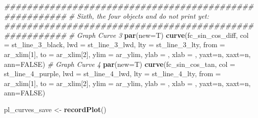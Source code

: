 \documentclass[
]{book}
\newenvironment{Shaded}{\begin{snugshade}}{\end{snugshade}}
\newcommand{\CommentTok}[1]{\textcolor[rgb]{0.56,0.35,0.01}{\textit{#1}}}
\newcommand{\DataTypeTok}[1]{\textcolor[rgb]{0.13,0.29,0.53}{#1}}
\newcommand{\DecValTok}[1]{\textcolor[rgb]{0.00,0.00,0.81}{#1}}
\newcommand{\KeywordTok}[1]{\textcolor[rgb]{0.13,0.29,0.53}{\textbf{#1}}}
\newcommand{\NormalTok}[1]{#1}
\newcommand{\OtherTok}[1]{\textcolor[rgb]{0.56,0.35,0.01}{#1}}
\newcommand{\StringTok}[1]{\textcolor[rgb]{0.31,0.60,0.02}{#1}}
\begin{document}
\begin{Shaded}
\begin{Highlighting}[]
\CommentTok{\#\#\#\#\#\#\#\#\#\#\#\#\#\#\#\#\#\#\#\#\#\#\#\#\#\#\#\#\#\#\#\#\#\#\#\#\#\#\#\#\#\#\#\#\#\#\#\#\#\#\#\#\#\#\#}
\CommentTok{\# Sixth, the four objects and do not print yet:}
\CommentTok{\#\#\#\#\#\#\#\#\#\#\#\#\#\#\#\#\#\#\#\#\#\#\#\#\#\#\#\#\#\#\#\#\#\#\#\#\#\#\#\#\#\#\#\#\#\#\#\#\#\#\#\#\#\#\#}
\CommentTok{\# Graph Curve 3}
\KeywordTok{par}\NormalTok{(}\DataTypeTok{new=}\NormalTok{T)}
\KeywordTok{curve}\NormalTok{(fc\_sin\_cos\_diff,}
      \DataTypeTok{col =}\NormalTok{ st\_line\_}\DecValTok{3}\NormalTok{\_black,}
      \DataTypeTok{lwd =}\NormalTok{ st\_line\_}\DecValTok{3}\NormalTok{\_lwd, }\DataTypeTok{lty =}\NormalTok{ st\_line\_}\DecValTok{3}\NormalTok{\_lty,}
      \DataTypeTok{from =}\NormalTok{ ar\_xlim[}\DecValTok{1}\NormalTok{], }\DataTypeTok{to =}\NormalTok{ ar\_xlim[}\DecValTok{2}\NormalTok{], }\DataTypeTok{ylim =}\NormalTok{ ar\_ylim,}
      \DataTypeTok{ylab =} \StringTok{\textquotesingle{}\textquotesingle{}}\NormalTok{, }\DataTypeTok{xlab =} \StringTok{\textquotesingle{}\textquotesingle{}}\NormalTok{, }\DataTypeTok{yaxt=}\StringTok{\textquotesingle{}n\textquotesingle{}}\NormalTok{, }\DataTypeTok{xaxt=}\StringTok{\textquotesingle{}n\textquotesingle{}}\NormalTok{, }\DataTypeTok{ann=}\OtherTok{FALSE}\NormalTok{)}
\CommentTok{\# Graph Curve 4}
\KeywordTok{par}\NormalTok{(}\DataTypeTok{new=}\NormalTok{T)}
\KeywordTok{curve}\NormalTok{(fc\_sin\_cos\_tan,}
      \DataTypeTok{col =}\NormalTok{ st\_line\_}\DecValTok{4}\NormalTok{\_purple,}
      \DataTypeTok{lwd =}\NormalTok{ st\_line\_}\DecValTok{4}\NormalTok{\_lwd, }\DataTypeTok{lty =}\NormalTok{ st\_line\_}\DecValTok{4}\NormalTok{\_lty,}
      \DataTypeTok{from =}\NormalTok{ ar\_xlim[}\DecValTok{1}\NormalTok{], }\DataTypeTok{to =}\NormalTok{ ar\_xlim[}\DecValTok{2}\NormalTok{], }\DataTypeTok{ylim =}\NormalTok{ ar\_ylim,}
      \DataTypeTok{ylab =} \StringTok{\textquotesingle{}\textquotesingle{}}\NormalTok{, }\DataTypeTok{xlab =} \StringTok{\textquotesingle{}\textquotesingle{}}\NormalTok{, }\DataTypeTok{yaxt=}\StringTok{\textquotesingle{}n\textquotesingle{}}\NormalTok{, }\DataTypeTok{xaxt=}\StringTok{\textquotesingle{}n\textquotesingle{}}\NormalTok{, }\DataTypeTok{ann=}\OtherTok{FALSE}\NormalTok{)}
\end{Highlighting}
\end{Shaded}

\begin{Shaded}
\begin{Highlighting}[]
\NormalTok{pl\_curves\_save \textless{}{-}}\StringTok{ }\KeywordTok{recordPlot}\NormalTok{()}
\end{Highlighting}
\end{Shaded}
\end{document}
